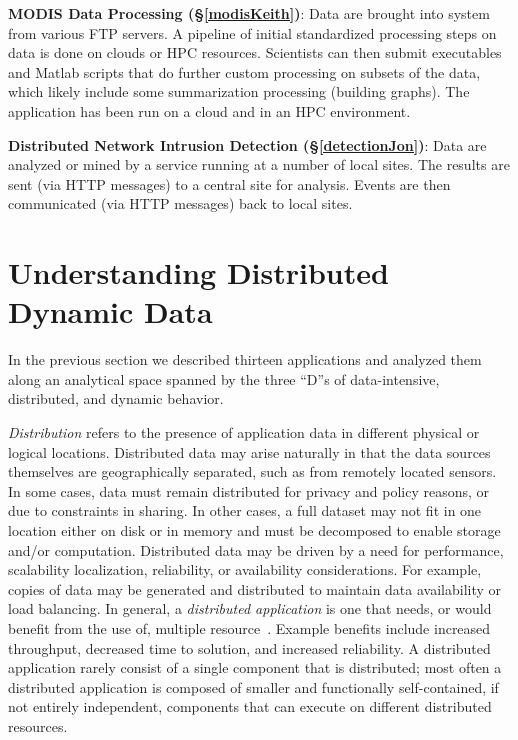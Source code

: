 {\bf MODIS Data Processing (\S\ref{modisKeith})}: Data are brought
into system from various FTP servers.  A pipeline of initial
standardized processing steps on data is done on clouds or HPC
resources.  Scientists can then submit executables and Matlab scripts
that do further custom processing on subsets of the data, which likely
include some summarization processing (building graphs).  The
application has been run on a cloud and in an HPC environment.


{\bf Distributed Network Intrusion Detection (\S\ref{detectionJon})}:
Data are analyzed or mined by a service running at a number of local
sites. The results are sent (via HTTP messages) to a central site for
analysis. Events are then communicated (via HTTP messages) back to
local sites.

\section{Understanding Distributed Dynamic Data}\label{sec:distdyndata}



In the previous section we described thirteen applications and
analyzed them along an analytical space
spanned by the three ``D''s of data-intensive, distributed, and
dynamic behavior.

\emph{Distribution} refers to the presence of application data in
different physical or logical locations. Distributed data may arise
naturally in that the data sources themselves are geographically
separated, such as from remotely located sensors.  In some cases, data
must remain distributed for privacy and policy reasons, or due to
constraints in sharing.  In other cases, a full dataset may not fit in
one location either on disk or in memory and must be decomposed to
enable storage and/or computation. Distributed data may be driven by a
need for performance, scalability localization, reliability, or
availability considerations. For example, copies of data may be
generated and distributed to maintain data availability or load
balancing.  In general, a \emph{distributed application} is one that
needs, or would benefit from the use of, multiple
resource~\cite{dpa_surveypaper}. Example benefits include increased
throughput, decreased time to solution, and increased reliability.  A
distributed application rarely consist of a single component that is
distributed; most often a distributed application is composed of
smaller and functionally self-contained, if not entirely independent,
components that can execute on different distributed resources.

